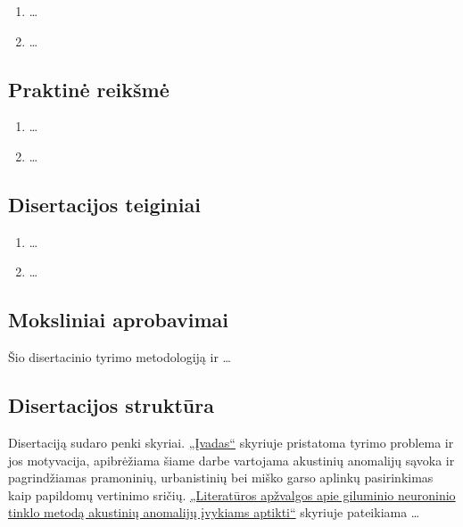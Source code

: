 \begin{enumerate}[leftmargin=*]
	\item \dots
	
	\item \dots
\end{enumerate}

\subsection*{Praktinė reikšmė}
\begin{enumerate}[leftmargin=*]
	\item \dots
	\item \dots
\end{enumerate}

\subsection*{Disertacijos teiginiai}
\begin{enumerate}
	\item \dots
	\item \dots
\end{enumerate}

\subsection*{Moksliniai aprobavimai}
Šio disertacinio tyrimo metodologiją ir \dots

\subsection*{Disertacijos struktūra}

Disertaciją sudaro penki skyriai. \hyperref[chap:introlt]{„Įvadas“} skyriuje pristatoma tyrimo problema ir jos motyvacija, apibrėžiama šiame darbe vartojama akustinių anomalijų sąvoka ir pagrindžiamas pramoninių, urbanistinių bei miško garso aplinkų pasirinkimas kaip papildomų vertinimo sričių. \hyperref[chap:twolt]{„Literatūros apžvalgos apie giluminio neuroninio tinklo metodą akustinių anomalijų įvykiams aptikti“} skyriuje pateikiama \dots
